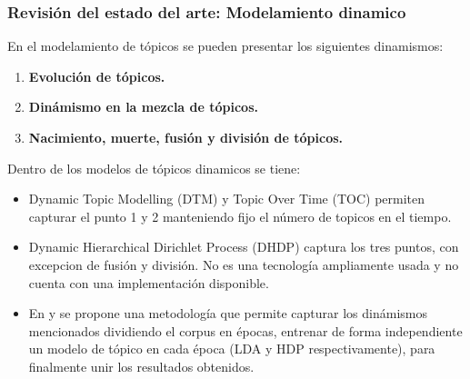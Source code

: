 \documentclass[
	spanish, %
	aspectratio=43, %
	hyperref={pdfencoding=auto,psdextra},
	xcolor={dvipsnames,table,usenames}
]{beamer}
\begin{document}
\begin{frame}
  
\frametitle{Revisión del estado del arte: Modelamiento dinamico}
En el modelamiento de tópicos se pueden presentar los siguientes dinamismos:

\begin{enumerate}
  \item \textbf{Evolución de tópicos.}
  \item \textbf{Dinámismo en la mezcla de tópicos.}
  \item \textbf{Nacimiento, muerte, fusión y división de tópicos.}
\end{enumerate}

Dentro de los modelos de tópicos dinamicos se tiene:
\begin{itemize}
  \item Dynamic Topic Modelling (DTM) y Topic Over Time (TOC)\cite{wang2006topics} permiten capturar el punto 1 y 2 manteniendo fijo el número de topicos en el tiempo.
  \item Dynamic Hierarchical Dirichlet Process (DHDP)\cite{ahmed2012timeline} captura los tres puntos, con excepcion de fusión y división. No es una tecnología ampliamente usada y no cuenta con una implementación disponible.\\
  \item En \cite{wilson2011tracking} y \cite{beykikhoshk2018discovering} se propone una metodología que permite capturar los dinámismos mencionados dividiendo el corpus en épocas, entrenar de forma independiente un modelo de tópico en cada época (LDA y HDP respectivamente), para finalmente unir los resultados obtenidos. 
\end{itemize}

%


\end{frame}
\end{document}
